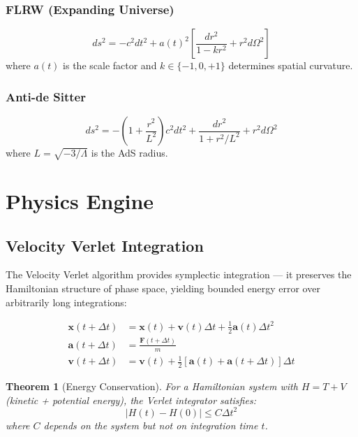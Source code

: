 \documentclass[12pt, a4paper]{article}
\newtheorem{theorem}{Theorem}[section]
\begin{document}
\subsubsection{FLRW (Expanding Universe)}
\begin{equation}
    ds^2 = -c^2 dt^2 + a(t)^2 \left[
        \frac{dr^2}{1 - kr^2} + r^2 d\Omega^2
    \right]
\end{equation}
where $a(t)$ is the scale factor and $k \in \{-1, 0, +1\}$ determines spatial curvature.

\subsubsection{Anti-de Sitter}
\begin{equation}
    ds^2 = -\left(1 + \frac{r^2}{L^2}\right) c^2 dt^2
    + \frac{dr^2}{1 + r^2/L^2} + r^2 d\Omega^2
\end{equation}
where $L = \sqrt{-3/\Lambda}$ is the AdS radius.

\section{Physics Engine}
\label{sec:physics}

\subsection{Velocity Verlet Integration}

The Velocity Verlet algorithm provides symplectic integration — it preserves
the Hamiltonian structure of phase space, yielding bounded energy error over
arbitrarily long integrations:

\begin{align}
    \mathbf{x}(t + \Delta t) &= \mathbf{x}(t) + \mathbf{v}(t)\Delta t
        + \frac{1}{2}\mathbf{a}(t)\Delta t^2 \\
    \mathbf{a}(t + \Delta t) &= \frac{\mathbf{F}(t + \Delta t)}{m} \\
    \mathbf{v}(t + \Delta t) &= \mathbf{v}(t) + \frac{1}{2}
        \left[\mathbf{a}(t) + \mathbf{a}(t + \Delta t)\right] \Delta t
\end{align}

\begin{theorem}[Energy Conservation]
For a Hamiltonian system with $H = T + V$ (kinetic + potential energy),
the Verlet integrator satisfies:
\begin{equation}
    |H(t) - H(0)| \leq C \Delta t^2
\end{equation}
where $C$ depends on the system but not on integration time $t$.
\end{theorem}
\end{document}
